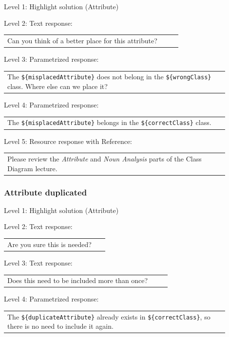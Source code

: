 \noindent Level 1: Highlight solution (Attribute) \medskip

\noindent Level 2: Text response: \medskip

\begin{tabular}{|p{0.9\linewidth}}
Can you think of a better place for this attribute?
\end{tabular} \medskip

\noindent Level 3: Parametrized response: \medskip

\begin{tabular}{|p{0.9\linewidth}}
The \verb|${misplacedAttribute}| does not belong in the \verb|${wrongClass}| class. Where else can we place it?
\end{tabular} \medskip

\noindent Level 4: Parametrized response: \medskip

\begin{tabular}{|p{0.9\linewidth}}
The \verb|${misplacedAttribute}| belongs in the \verb|${correctClass}| class.
\end{tabular} \medskip

\noindent Level 5: Resource response with Reference: \medskip

\begin{tabular}{|p{0.9\linewidth}}
Please review the \textit{Attribute} and \textit{Noun Analysis} parts of the Class Diagram lecture.
\end{tabular} \medskip


\subsubsection{Attribute duplicated}

\noindent Level 1: Highlight solution (Attribute) \medskip

\noindent Level 2: Text response: \medskip

\begin{tabular}{|p{0.9\linewidth}}
Are you sure this is needed?
\end{tabular} \medskip

\noindent Level 3: Text response: \medskip

\begin{tabular}{|p{0.9\linewidth}}
Does this need to be included more than once?
\end{tabular} \medskip

\noindent Level 4: Parametrized response: \medskip

\begin{tabular}{|p{0.9\linewidth}}
The \verb|${duplicateAttribute}| already exists in \verb|${correctClass}|, so there is no need to include it again.
\end{tabular} \medskip

